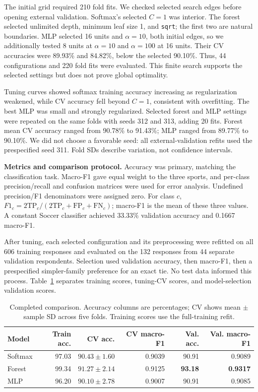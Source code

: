 \documentclass[10pt,letterpaper]{article}
\newcommand{\topic}[1]{\par\smallskip\textbf{#1}\quad}
\begin{document}
The initial grid required 210 fold fits. We checked selected search edges before
opening external validation. Softmax's selected $C=1$ was interior. The forest
selected unlimited depth, minimum leaf size 1, and \texttt{sqrt}; the first two are
natural boundaries. MLP selected 16 units and $\alpha=10$, both initial edges, so
we additionally tested 8 units at $\alpha=10$ and $\alpha=100$ at 16 units.
Their CV accuracies were 89.93\% and 84.82\%, below the selected 90.10\%.
Thus, 44 configurations and 220 fold fits were evaluated. This finite search
supports the selected settings but does not prove global optimality.

Tuning curves showed softmax training accuracy increasing as regularization
weakened, while CV accuracy fell beyond $C=1$, consistent with overfitting.
The best MLP was small and strongly regularized. Selected forest and MLP settings
were repeated on the same folds with seeds 312 and 313, adding 20 fits.
Forest mean CV accuracy ranged from 90.78\% to 91.43\%; MLP ranged from 89.77\%
to 90.10\%. We did not choose a favorable seed: all external-validation refits
used the prespecified seed 311. Fold SDs describe variation, not confidence intervals.

\topic{Metrics and comparison protocol.}
Accuracy was primary, matching the classification task. Macro-F1 gave equal
weight to the three sports, and per-class precision/recall and confusion matrices
were used for error analysis. Undefined precision/F1 denominators were assigned
zero. For class $c$, $F1_c=2\mathrm{TP}_c/(2\mathrm{TP}_c+\mathrm{FP}_c+\mathrm{FN}_c)$;
macro-F1 is the mean of these three values. A constant Soccer classifier achieved
33.33\% validation accuracy and 0.1667 macro-F1.

After tuning, each selected configuration and its preprocessing were refitted on
all 606 training responses and evaluated on the 132 responses from 44 separate
validation respondents. Selection used validation accuracy, then macro-F1, then
a prespecified simpler-family preference for an exact tie. No test data informed
this process. Table~\ref{tab:results} separates training scores, tuning-CV scores,
and model-selection validation scores.

\begin{table}[ht]
\centering\small
\caption{Completed comparison. Accuracy columns are percentages; CV shows mean
$\pm$ sample SD across five folds. Training scores use the full-training refit.}
\label{tab:results}
\begin{tabular}{lrrrrr}
\toprule
Model & Train acc. & CV acc. & CV macro-F1 & Val. acc. & Val. macro-F1\\
\midrule
Softmax & 97.03 & $90.43\pm1.60$ & 0.9039 & 90.91 & 0.9089\\
Forest & 99.34 & $91.27\pm2.14$ & 0.9125 & \textbf{93.18} & \textbf{0.9317}\\
MLP & 96.20 & $90.10\pm2.78$ & 0.9007 & 90.91 & 0.9085\\
\bottomrule
\end{tabular}
\end{table}
\end{document}
